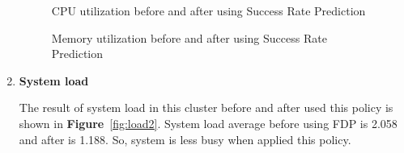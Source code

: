 \documentclass[12pt,oneside,openright,a4paper]{cpe-english-project}
\begin{document}
\begin{enumerate}
\begin{figure}[!h]\centering
    \setlength{\fboxrule}{0mm} %
    \setlength{\fboxsep}{0cm}
    \caption{CPU utilization before and after using Success Rate Prediction}\label{fig:cpu2}
\end{figure}

\begin{figure}[!h]\centering
    \setlength{\fboxrule}{0mm} %
    \setlength{\fboxsep}{0cm}
    \caption{Memory utilization before and after using Success Rate Prediction}\label{fig:mem2}
\end{figure}

\newpage
  \item \textbf{System load}
  
\hspace{10mm}The result of system load in this cluster before and after used this policy is shown in \textbf{Figure}~\ref{fig:load2}. System load average before using FDP is 2.058 and after is 1.188. So, system is less busy when applied this policy.
  

\end{enumerate}
\end{document}
